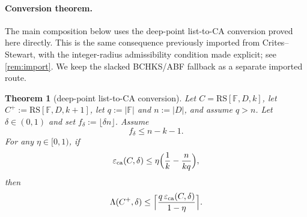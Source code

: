 \documentclass[11pt]{article}
\newtheorem{theorem}{Theorem}[section]
\theoremstyle{definition}
\theoremstyle{remark}
\newcommand{\F}{\mathbb{F}}
\newcommand{\RS}{\mathrm{RS}}
\newcommand{\eca}{\varepsilon_{\mathrm{ca}}}
\newcommand{\Lst}{\Lambda}
\begin{document}
\paragraph{Conversion theorem.} The main composition below uses the deep-point list-to-CA conversion proved here directly. This is the same consequence previously imported from Crites--Stewart, with the integer-radius admissibility condition made explicit; see \cref{rem:import}. We keep the slacked BCHKS/ABF fallback as a separate imported route.

\begin{theorem}[deep-point list-to-CA conversion]
\label{thm:A}
Let $C=\RS[\F,D,k]$, let $C^+:=\RS[\F,D,k+1]$, let
$q:=|\F|$ and $n:=|D|$, and assume $q>n$.  Let $\delta\in(0,1)$ and set
$f_\delta:=\lfloor \delta n\rfloor$.  Assume
\[
        f_\delta \le n-k-1 .
\]
For any $\eta\in[0,1)$, if
\[
        \eca(C,\delta)
        \le
        \eta\Bigl(\frac1k-\frac n{kq}\Bigr),
\]
then
\[
        \Lst(C^+,\delta)
        \le
        \Bigl\lceil
        \frac{q\,\eca(C,\delta)}{1-\eta}
        \Bigr\rceil .
\]
\end{theorem}
\end{document}
